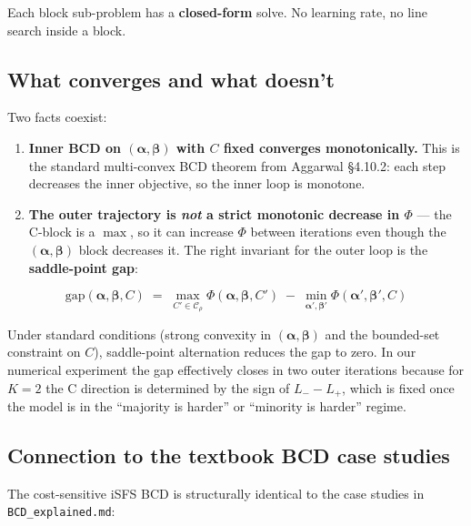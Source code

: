 \documentclass[11pt,a4paper]{article}
\begin{document}
Each block sub-problem has a \textbf{closed-form} solve. No learning rate, no line search inside a block.

\subsection{What converges and what doesn't}

Two facts coexist:

\begin{enumerate}[leftmargin=*,itemsep=2pt]
  \item \textbf{Inner BCD on $(\boldsymbol{\alpha}, \boldsymbol{\beta})$ with $C$ fixed converges monotonically.} This is the standard multi-convex BCD theorem from Aggarwal \S 4.10.2: each step decreases the inner objective, so the inner loop is monotone.
  \item \textbf{The outer trajectory is \emph{not} a strict monotonic decrease in $\Phi$} --- the C-block is a $\max$, so it can increase $\Phi$ between iterations even though the $(\boldsymbol{\alpha}, \boldsymbol{\beta})$ block decreases it. The right invariant for the outer loop is the \textbf{saddle-point gap}:
\end{enumerate}
\[
\text{gap}(\boldsymbol{\alpha}, \boldsymbol{\beta}, C) \;=\; \max_{C' \in \mathcal{C}_\rho}\Phi(\boldsymbol{\alpha},\boldsymbol{\beta},C') \;-\; \min_{\boldsymbol{\alpha}',\boldsymbol{\beta}'}\Phi(\boldsymbol{\alpha}',\boldsymbol{\beta}',C)
\]

Under standard conditions (strong convexity in $(\boldsymbol{\alpha}, \boldsymbol{\beta})$ and the bounded-set constraint on $C$), saddle-point alternation reduces the gap to zero. In our numerical experiment the gap effectively closes in two outer iterations because for $K = 2$ the C direction is determined by the sign of $L_- - L_+$, which is fixed once the model is in the ``majority is harder'' or ``minority is harder'' regime.

\subsection{Connection to the textbook BCD case studies}

The cost-sensitive iSFS BCD is structurally identical to the case studies in \texttt{BCD\_explained.md}:
\end{document}
